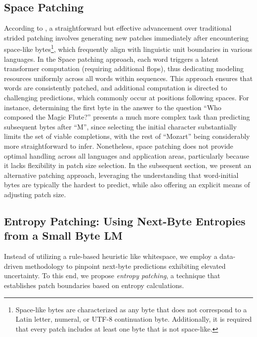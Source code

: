 \subsection{Space Patching}
\label{section:white-patch}

According to \citet{slagle2024spacebyte}, a straightforward but effective advancement over traditional strided patching involves generating new patches immediately after encountering space-like bytes\footnote{
    Space-like bytes are characterized as any byte that does not correspond to a Latin letter, numeral, or UTF-8 continuation byte. Additionally, it is required that every patch includes at least one byte that is not space-like. }, which frequently align with linguistic unit boundaries in various languages. In the Space patching approach, each word triggers a latent transformer computation (requiring additional flops), thus dedicating modeling resources uniformly across all words within sequences. This approach ensures that words are consistently patched, and additional computation is directed to challenging predictions, which commonly occur at positions following spaces. For instance, determining the first byte in the answer to the question ``Who composed the Magic Flute?\uline{\hspace{.6em}}'' presents a much more complex task than predicting subsequent bytes after ``M'', since selecting the initial character substantially limits the set of viable completions, with the rest of ``Mozart'' being considerably more straightforward to infer. Nonetheless, space patching does not provide optimal handling across all languages and application areas, particularly because it lacks flexibility in patch size selection. In the subsequent section, we present an alternative patching approach, leveraging the understanding that word-initial bytes are typically the hardest to predict, while also offering an explicit means of adjusting patch size.

\subsection{Entropy Patching: Using Next-Byte Entropies from a Small Byte LM}
\label{section:dyn-patch}

Instead of utilizing a rule-based heuristic like whitespace, we employ a data-driven methodology to pinpoint next-byte predictions exhibiting elevated uncertainty. To this end, we propose \textit{entropy patching}, a technique that establishes patch boundaries based on entropy calculations.

